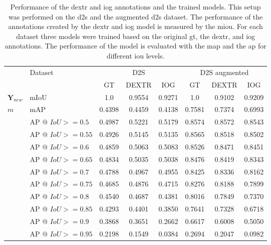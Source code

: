 \begin{table}[h!]
	\centering
	\begin{tabular}{ ll|c c c|c c c}
		\toprule
								& Dataset				& \multicolumn{3}{c}{D2S} 			& \multicolumn{3}{c}{D2S augmented} \\		 
								& 						& GT		& DEXTR		& IOG		& GT		& DEXTR		& IOG		\\
		\midrule
		$ \textbf{Y}_{new} $ 	& mIoU 					& 1.0		& 0.9554	& 0.9271	& 1.0		& 0.9102	& 0.9209	\\
		\midrule
		$ m $					& mAP 					& 0.4398	& 0.4459	& 0.4138	& 0.7581	& 0.7374	& 0.6993	\\
		
								& AP @ $ IoU >= 0.5 $	& 0.4987	& 0.5221	& 0.5179	& 0.8574	& 0.8572	& 0.8543	\\
								& AP @ $ IoU >= 0.55 $ 	& 0.4926	& 0.5145	& 0.5135	& 0.8565	& 0.8518	& 0.8502	\\
								& AP @ $ IoU >= 0.6 $	& 0.4859	& 0.5063	& 0.5083	& 0.8526	& 0.8471	& 0.8451	\\
								& AP @ $ IoU >= 0.65 $ 	& 0.4834	& 0.5035	& 0.5038	& 0.8476	& 0.8419	& 0.8343	\\
								& AP @ $ IoU >= 0.7 $	& 0.4788	& 0.4967	& 0.4955	& 0.8425	& 0.8336	& 0.8162	\\
								& AP @ $ IoU >= 0.75 $ 	& 0.4685	& 0.4876	& 0.4715	& 0.8276	& 0.8188	& 0.7899	\\
								& AP @ $ IoU >= 0.8 $	& 0.4540	& 0.4687	& 0.4381	& 0.8016	& 0.7849	& 0.7370	\\
								& AP @ $ IoU >= 0.85 $ 	& 0.4293	& 0.4401	& 0.3850	& 0.7641	& 0.7328	& 0.6718	\\
								& AP @ $ IoU >= 0.9 $	& 0.3868	& 0.3651	& 0.2662	& 0.6617	& 0.6008	& 0.5050	\\
								& AP @ $ IoU >= 0.95 $ 	& 0.2198	& 0.1549	& 0.0384	& 0.2694	& 0.2047	& 0.0982	\\
		\bottomrule
	\end{tabular}
	\caption[Performance of models trained with DEXTR and IOG annotations]{
		Performance of the \gls{dextr} and \gls{iog} annotations and the trained models.
		This setup was performed on the \gls{d2s} and the augmented \gls{d2s} dataset.
		The performance of the annotations created by the \gls{dextr} and \gls{iog} model is measured by the \gls{miou}.
		For each dataset three models were trained based on the original \gls{gt}, the \gls{dextr}, and \gls{iog} annotations.
		The performance of the model is evaluated with the \gls{map} and the \gls{ap} for different \gls{iou} levels.		
	}\label{tab:ch5:results_annot_usability}
\end{table}

